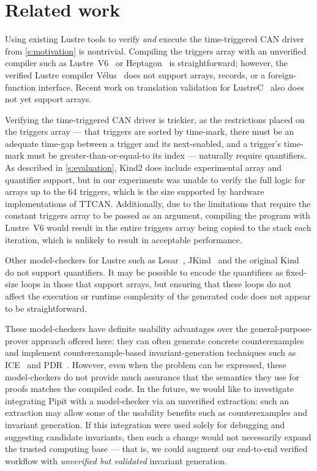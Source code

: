 \documentclass[a4paper,UKenglish,cleveref, autoref, thm-restate,anonymous]{lipics-v2021}
\begin{document}
\section{Related work}
\label{s:related-work}



Using existing Lustre tools to verify \emph{and} execute the time-triggered CAN driver from \autoref{s:motivation} is nontrivial.
Compiling the triggers array with an unverified compiler such as Lustre~V6~\cite{jahier2016lustre} or Heptagon~\cite{gerard2012modular} is straightforward; however, the verified Lustre compiler Vélus~\cite{bourke2023verified} does not support arrays, records, or a foreign-function interface.
Recent work on translation validation for LustreC~\cite{brun2023equation} also does not yet support arrays.

Verifying the time-triggered CAN driver is trickier, as the restrictions placed on the triggers array --- that triggers are sorted by time-mark, there must be an adequate time-gap between a trigger and its next-enabled, and a trigger's time-mark must be greater-than-or-equal-to its index --- naturally require quantifiers.
As described in \autoref{s:evaluation}, Kind2 does include experimental array and quantifier support, but in our experiments was unable to verify the full logic for arrays up to the 64 triggers, which is the size supported by hardware implementations of TTCAN.
Additionally, due to the limitations that require the constant triggers array to be passed as an argument, compiling the program with Lustre~V6 would result in the entire triggers array being copied to the stack each iteration, which is unlikely to result in acceptable performance.

Other model-checkers for Lustre such as Lesar~\cite{raymond2008synchronous}, JKind~\cite{gacek2018jkind} and the original Kind~\cite{hagen2008scaling} do not support quantifiers.
It may be possible to encode the quantifiers as fixed-size loops in those that support arrays, but ensuring that these loops do not affect the execution or runtime complexity of the generated code does not appear to be straightforward.

These model-checkers have definite usability advantages over the general-purpose-prover approach offered here: they can often generate concrete counterexamples and implement counterexample-based invariant-generation techniques such as ICE~\cite{garg2014ice} and PDR~\cite{bradley2011sat,een2011efficient}.
However, even when the problem can be expressed, these model-checkers do not provide much assurance that the semantics they use for proofs matches the compiled code.
In the future, we would like to investigate integrating Pipit with a model-checker via an unverified extraction: such an extraction may allow some of the usability benefits such as counterexamples and invariant generation.
If this integration were used solely for debugging and suggesting candidate invariants, then such a change would not necessarily expand the trusted computing base --- that is, we could augment our end-to-end verified workflow with \emph{unverified but validated} invariant generation.
\end{document}
